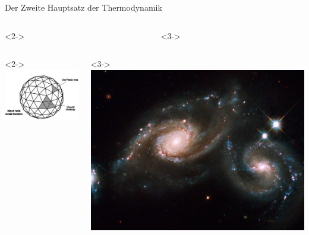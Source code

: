 \documentclass[ngerman,ph]{URbeamer}
\begin{document}
	\begin{frame}{Der Zweite Hauptsatz der Thermodynamik}
		\begin{columns}
			\begin{column}[c]{0.45\textwidth}<2->
			\end{column}
			\begin{column}[c]{0.45\textwidth}<3->
			\end{column}
		\end{columns}
		\vspace{0.3cm}
		\begin{columns}
			\begin{column}[c]{0.45\textwidth}<2->
				\includegraphics[width=\textwidth]{BHentropy1}
			\end{column}
			\begin{column}[c]{0.45\textwidth}<3->
				\includegraphics[width=\textwidth]{kollidierendeSHs}
			\end{column}
		\end{columns}
	\end{frame} %
	
\end{document}
